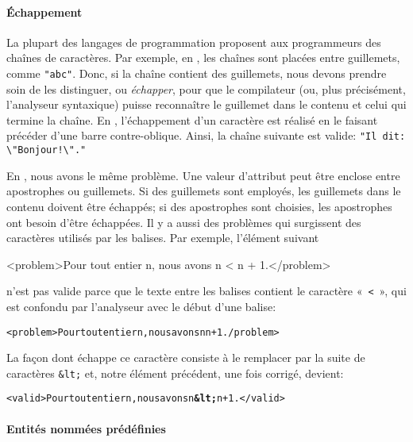 \paragraph{Échappement}

La plupart des langages de programmation proposent aux programmeurs
des chaînes de caractères. Par exemple, en \Clang, les chaînes sont
placées entre guillemets, comme \verb|"abc"|. Donc, si la chaîne
contient des guillemets, nous devons prendre soin de les distinguer,
ou \emph{échapper}, pour que le compilateur (ou, plus précisément,
l'analyseur syntaxique) puisse reconnaître le guillemet dans le
contenu et celui qui termine la chaîne. En \Clang, l'échappement d'un
caractère est réalisé en le faisant précéder d'une barre
contre-oblique. Ainsi, la chaîne suivante est valide:
\verb|"Il dit: \"Bonjour!\"."|

En \XML, nous avons le même problème. Une valeur d'attribut peut être
enclose entre apostrophes ou guillemets. Si des guillemets sont
employés, les guillemets dans le contenu doivent être échappés; si des
apostrophes sont choisies, les apostrophes ont besoin d'être
échappées. Il y a aussi des problèmes qui surgissent des caractères
utilisés par les balises. Par exemple, l'élément suivant
\begin{sverb}
<problem>Pour tout entier n, nous avons n < n + 1.</problem>
\end{sverb}
n'est pas valide parce que le texte entre les balises contient le
caractère «~\texttt{<}~», qui est confondu par l'analyseur \XML avec le
début d'une balise:
\begin{alltt}
\small<problem>Pour tout entier n, nous avons n \fbox{<\,} n + 1.\fbox{<\,}/problem>
\end{alltt}
La façon dont \XML échappe ce caractère consiste à le remplacer par la
suite de caractères \verb|&lt;| et, notre élément précédent, une fois
corrigé, devient:
\begin{alltt}
\small<valid>Pour tout entier n, nous avons n \textbf{&lt;} n + 1.</valid>
\end{alltt}


\paragraph{Entités nommées prédéfinies}

